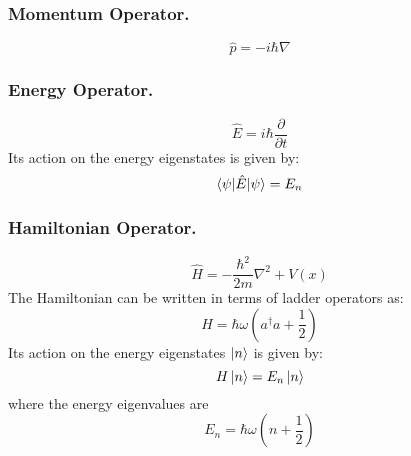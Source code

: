 \documentclass[../../../main.tex]{subfiles}
\begin{document}
\subsubsection*{Momentum Operator.} 
\begin{equation*}
    \hat{p}= -i\hbar\nabla
\end{equation*}

\subsubsection*{Energy Operator.} 
\begin{equation*}
    \hat{E}=i \hbar \frac{\partial}{\partial t}
\end{equation*}
Its action on the energy eigenstates is given by:
\begin{equation*}
    \braket{\psi|\hat{E}|\psi}=E_n
\end{equation*}

\subsubsection*{Hamiltonian Operator.}
\begin{equation*}
    \hat{H}=-\frac{\hbar^2}{2m}\nabla^2 +V(x)
\end{equation*}
The Hamiltonian can be written in terms of ladder operators as:
\begin{equation*}
H = \hbar\omega \left( a^\dagger a + \frac{1}{2} \right)
\end{equation*}
Its action on the energy eigenstates $\ket{n}$ is given by:
\begin{equation*}
    H \ket{n} = E_n\ket{n}
\end{equation*}
where the energy eigenvalues are
\begin{equation*}
    E_n=\hbar\omega\left(n+\frac{1}{2}\right)
\end{equation*}
\end{document}
